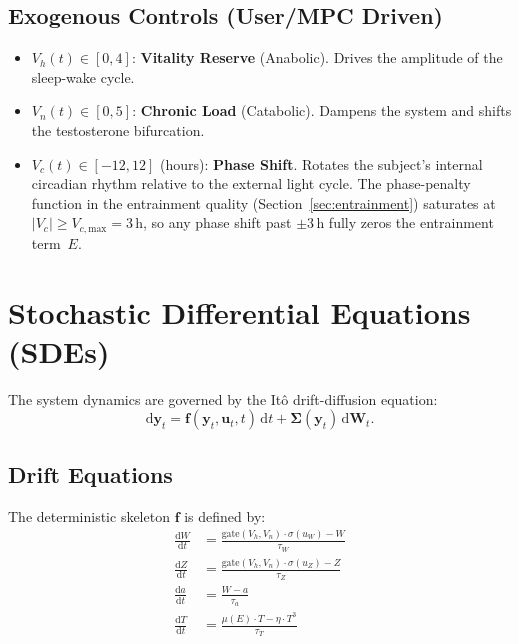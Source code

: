 \documentclass[11pt,a4paper]{article}
\begin{document}
\subsection{Exogenous Controls (User/MPC Driven)}
\begin{itemize}
    \item $V_h(t) \in [0, 4]$: \textbf{Vitality Reserve} (Anabolic). Drives the amplitude of the sleep-wake cycle.
    \item $V_n(t) \in [0, 5]$: \textbf{Chronic Load} (Catabolic). Dampens the system and shifts the testosterone bifurcation.
    \item $V_c(t) \in [-12, 12]$ (hours): \textbf{Phase Shift}. Rotates the subject's internal circadian rhythm relative to the external light cycle. The phase-penalty function in the entrainment quality (Section~\ref{sec:entrainment}) saturates at $|V_c| \geq V_{c,\text{max}} = 3$\,h, so any phase shift past $\pm 3$\,h fully zeros the entrainment term~$E$.
\end{itemize}

\section{Stochastic Differential Equations (SDEs)}

The system dynamics are governed by the It\^o drift-diffusion equation:
\[
\mathrm{d}\mathbf{y}_t = \mathbf{f}(\mathbf{y}_t, \mathbf{u}_t, t) \, \mathrm{d}t + \boldsymbol{\Sigma}(\mathbf{y}_t) \, \mathrm{d}\mathbf{W}_t.
\]

\subsection{Drift Equations}

The deterministic skeleton $\mathbf{f}$ is defined by:
\begin{align}
\frac{\mathrm{d}W}{\mathrm{d}t} &= \frac{\text{gate}(V_h, V_n) \cdot \sigma(u_W) - W}{\tau_W} \\
\frac{\mathrm{d}Z}{\mathrm{d}t} &= \frac{\text{gate}(V_h, V_n) \cdot \sigma(u_Z) - Z}{\tau_Z} \\
\frac{\mathrm{d}a}{\mathrm{d}t} &= \frac{W - a}{\tau_a} \\
\frac{\mathrm{d}T}{\mathrm{d}t} &= \frac{\mu(E) \cdot T - \eta \cdot T^3}{\tau_T}
\end{align}
\end{document}
